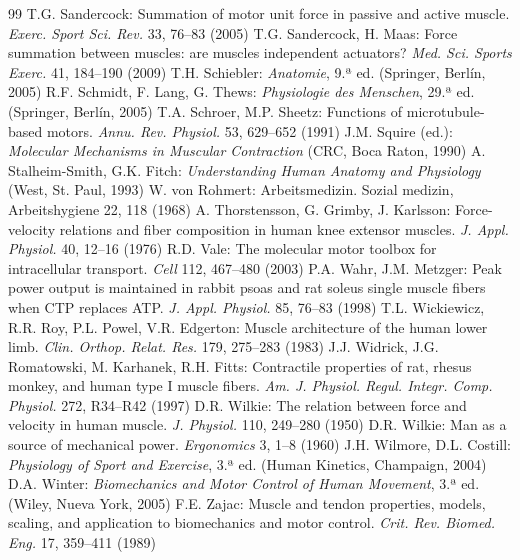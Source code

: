 \documentclass[12pt]{book}
\begin{document}
\begin{thebibliography}{99}
   T.G. Sandercock: Summation of motor unit force in passive and active muscle. \textit{Exerc. Sport Sci. Rev.} 33, 76--83 (2005)
   T.G. Sandercock, H. Maas: Force summation between muscles: are muscles independent actuators? \textit{Med. Sci. Sports Exerc.} 41, 184--190 (2009)
   T.H. Schiebler: \textit{Anatomie}, 9.ª ed. (Springer, Berlín, 2005)
   R.F. Schmidt, F. Lang, G. Thews: \textit{Physiologie des Menschen}, 29.ª ed. (Springer, Berlín, 2005)
   T.A. Schroer, M.P. Sheetz: Functions of microtubule-based motors. \textit{Annu. Rev. Physiol.} 53, 629--652 (1991)
   J.M. Squire (ed.): \textit{Molecular Mechanisms in Muscular Contraction} (CRC, Boca Raton, 1990)
   A. Stalheim-Smith, G.K. Fitch: \textit{Understanding Human Anatomy and Physiology} (West, St. Paul, 1993)
   W. von Rohmert: Arbeitsmedizin. Sozial medizin, Arbeitshygiene 22, 118 (1968)
   A. Thorstensson, G. Grimby, J. Karlsson: Force-velocity relations and fiber composition in human knee extensor muscles. \textit{J. Appl. Physiol.} 40, 12--16 (1976)
   R.D. Vale: The molecular motor toolbox for intracellular transport. \textit{Cell} 112, 467--480 (2003)
   P.A. Wahr, J.M. Metzger: Peak power output is maintained in rabbit psoas and rat soleus single muscle fibers when CTP replaces ATP. \textit{J. Appl. Physiol.} 85, 76--83 (1998)
   T.L. Wickiewicz, R.R. Roy, P.L. Powel, V.R. Edgerton: Muscle architecture of the human lower limb. \textit{Clin. Orthop. Relat. Res.} 179, 275--283 (1983)
   J.J. Widrick, J.G. Romatowski, M. Karhanek, R.H. Fitts: Contractile properties of rat, rhesus monkey, and human type I muscle fibers. \textit{Am. J. Physiol. Regul. Integr. Comp. Physiol.} 272, R34--R42 (1997)
   D.R. Wilkie: The relation between force and velocity in human muscle. \textit{J. Physiol.} 110, 249--280 (1950)
   D.R. Wilkie: Man as a source of mechanical power. \textit{Ergonomics} 3, 1--8 (1960)
   J.H. Wilmore, D.L. Costill: \textit{Physiology of Sport and Exercise}, 3.ª ed. (Human Kinetics, Champaign, 2004)
   D.A. Winter: \textit{Biomechanics and Motor Control of Human Movement}, 3.ª ed. (Wiley, Nueva York, 2005)
   F.E. Zajac: Muscle and tendon properties, models, scaling, and application to biomechanics and motor control. \textit{Crit. Rev. Biomed. Eng.} 17, 359--411 (1989)
\end{thebibliography}

\end{document}
